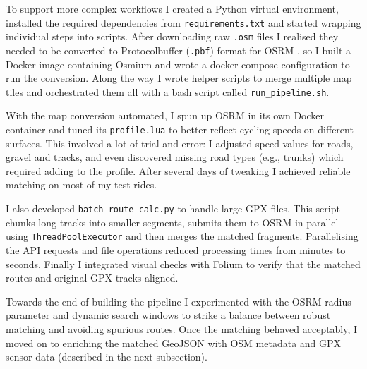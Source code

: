 \documentclass[11pt,twoside]{report}
\begin{document}
To support more complex workflows I created a Python virtual environment, installed the required dependencies from \texttt{requirements.txt} and started wrapping individual steps into scripts. After downloading raw \texttt{.osm} files I realised they needed to be converted to Protocolbuffer (\texttt{.pbf}) format for OSRM \citep{Luxen2011}, so I built a Docker image containing Osmium \citep{Osmium} and wrote a docker-compose configuration to run the conversion. Along the way I wrote helper scripts to merge multiple map tiles and orchestrated them all with a bash script called \texttt{run\_pipeline.sh}.

With the map conversion automated, I spun up OSRM in its own Docker container and tuned its \texttt{profile.lua} to better reflect cycling speeds on different surfaces. This involved a lot of trial and error: I adjusted speed values for roads, gravel and tracks, and even discovered missing road types (e.g., trunks) which required adding to the profile. After several days of tweaking I achieved reliable matching on most of my test rides.

I also developed \texttt{batch\_route\_calc.py} to handle large GPX files. This script chunks long tracks into smaller segments, submits them to OSRM in parallel using \texttt{ThreadPoolExecutor} and then merges the matched fragments. Parallelising the API requests and file operations reduced processing times from minutes to seconds. Finally I integrated visual checks with Folium \citep{folium} to verify that the matched routes and original GPX tracks aligned.

Towards the end of building the pipeline I experimented with the OSRM radius parameter and dynamic search windows to strike a balance between robust matching and avoiding spurious routes. Once the matching behaved acceptably, I moved on to enriching the matched GeoJSON with OSM metadata and GPX sensor data (described in the next subsection).

\end{document}
